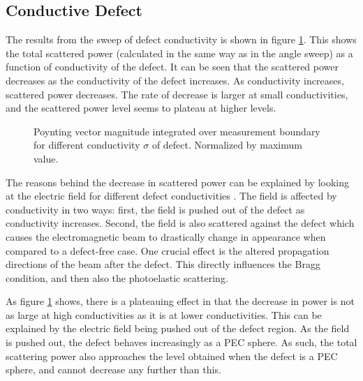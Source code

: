 \documentclass[11pt,twoside]{eitExjobb}
\begin{document}
	\subsection{Conductive Defect}
	The results from the sweep of defect conductivity is shown in figure \ref{fig:res-cond-power}. This shows the total scattered power (calculated in the same way as in the angle sweep) as a function of conductivity of the defect. It can be seen that the scattered power decreases as the conductivity of the defect increases. As conductivity increases, scattered power decreases. The rate of decrease is larger at small conductivities, and the scattered power level seems to plateau at higher levels.
	
	\begin{figure}[h]
		\centering
		\resizebox{\textwidth}{!}{
			
		}
		\caption{\label{fig:res-cond-power} Poynting vector magnitude integrated over measurement boundary for different conductivity $\sigma$ of defect. Normalized by maximum value.}
	\end{figure}
	
	The reasons behind the decrease in scattered power can be explained by looking at the electric field for different defect conductivities . The field is affected by conductivity in two ways: first, the field is pushed out of the defect as conductivity increases. Second, the field is also scattered against the defect which causes the electromagnetic beam to drastically change in appearance when compared to a defect-free case. One crucial effect is the altered propagation directions of the beam after the defect. This directly influences the Bragg condition, and then also the photoelastic scattering.
	
	As figure \ref{fig:res-cond-power} shows, there is a plateauing effect in that the decrease in power is not as large at high conductivities as it is at lower conductivities. This can be explained by the electric field being pushed out of the defect region. As the field is pushed out, the defect behaves increasingly as a PEC sphere. As such, the total scattering power also approaches the level obtained when the defect is a PEC sphere, and cannot decrease any further than this.
	
%			
	
\end{document}
